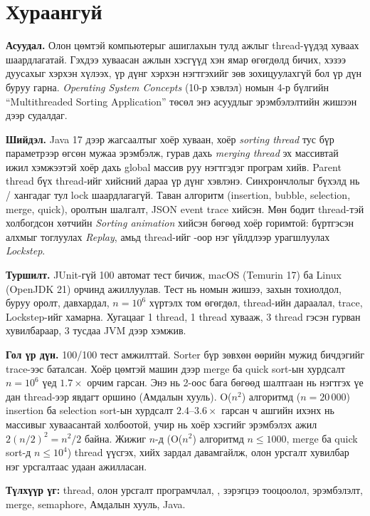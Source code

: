 \chapter*{Хураангуй}

\textbf{Асуудал.} Олон цөмтэй компьютерыг ашиглахын тулд ажлыг thread-үүдэд хуваах шаардлагатай.
Гэхдээ хуваасан ажлын хэсгүүд хэн ямар өгөгдөлд бичих, хэзээ дуусахыг хэрхэн хүлээх, үр дүнг хэрхэн
нэгтгэхийг зөв зохицуулахгүй бол үр дүн буруу гарна. \emph{Operating System Concepts} (10-р хэвлэл) номын
4-р бүлгийн “Multithreaded Sorting Application” төсөл энэ асуудлыг эрэмбэлэлтийн жишээн дээр судалдаг.

\textbf{Шийдэл.} Java 17 дээр жагсаалтыг хоёр хуваан, хоёр \emph{sorting thread} тус бүр параметрээр өгсөн
мужаа эрэмбэлж, гурав дахь \emph{merging thread} эх массивтай ижил хэмжээтэй хоёр дахь global массив руу
нэгтгэдэг програм хийв. Parent thread бүх thread-ийг  хийсний дараа үр дүнг хэвлэнэ. Синхрончлолыг
бүхэлд нь / хангадаг тул lock шаардлагагүй. Таван алгоритм (insertion, bubble,
selection, merge, quick), оролтын шалгалт, JSON event trace хийсэн. Мөн бодит thread-тэй холбогдсон хөтчийн
\emph{Sorting animation} хийсэн бөгөөд хоёр горимтой: бүртгэсэн алхмыг тоглуулах \emph{Replay}, амьд thread-ийг
-оор нэг үйлдлээр урагшлуулах \emph{Lockstep}.

\textbf{Туршилт.} JUnit-гүй 100 автомат тест бичиж, macOS (Temurin 17) ба Linux (OpenJDK 21) орчинд ажиллуулав.
Тест нь номын жишээ, захын тохиолдол, буруу оролт, давхардал, $n = 10^6$ хүртэлх том өгөгдөл, thread-ийн
дараалал, trace, Lockstep-ийг хамарна. Хугацааг 1 thread, 1 thread хувааж, 3 thread гэсэн гурван хувилбараар,
3 тусдаа JVM дээр хэмжив.

\textbf{Гол үр дүн.} 100/100 тест амжилттай. Sorter бүр зөвхөн өөрийн мужид бичдэгийг trace-ээс баталсан.
Хоёр цөмтэй машин дээр merge ба quick sort-ын хурдсалт $n = 10^6$ үед $1.7\times$ орчим гарсан. Энэ нь 2-оос
бага бөгөөд шалтгаан нь нэгтгэх үе дан thread-ээр явдагт оршино (Амдалын хууль). O($n^2$) алгоритмд
($n = 20\,000$) insertion ба selection sort-ын хурдсалт $2.4$--$3.6\times$ гарсан ч ашгийн ихэнх нь массивыг
хуваасантай холбоотой, учир нь хоёр хэсгийг эрэмбэлэх ажил $2(n/2)^2 = n^2/2$ байна. Жижиг $n$-д
(O($n^2$) алгоритмд $n \le 1000$, merge ба quick sort-д $n \le 10^4$) thread үүсгэх,  хийх зардал
давамгайлж, олон урсгалт хувилбар нэг урсгалтаас удаан ажилласан.

\medskip
\noindent\textbf{Түлхүүр үг:} thread, олон урсгалт програмчлал, , зэрэгцээ тооцоолол,
эрэмбэлэлт, merge, semaphore, Амдалын хууль, Java.
